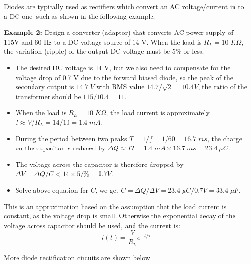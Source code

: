 Diodes are typically used as rectifiers which convert an AC voltage/current
in to a DC one, such as shown in the following example.

{\bf Example 2: } Design a converter (adaptor) that converts AC power 
supply of 115V and 60 Hz to a DC voltage source of 14 V. When the load is
$R_L=10\;K\Omega$, the variation (ripple) of the output DC voltage must 
be 5\% or less.



\begin{itemize}
\item The desired DC voltage is 14 V, but we also need to compensate for the
  voltage drop of 0.7 V due to the forward biased diode, so the  peak of the
  secondary output is $14.7\;V$ with RMS value $14.7/\sqrt{2}=10.4V$, the ratio
  of the transformer should be $115/10.4=11$. 
\item When the load is $R_L=10\;K\Omega$, the load current is approximately
  $I\approx V/R_L=14/10=1.4\;mA$.
\item During the period between two peaks $T=1/f=1/60=16.7\;ms$, the charge 
	on the capacitor is reduced by $\Delta Q\approx IT=1.4\;mA\times 
        16.7\;ms=23.4\;\mu C$. 	
\item The voltage across the capacitor is therefore dropped by
	$\Delta V=\Delta Q/C < 14\times 5/\%=0.7V $. 
\item Solve above equation for $C$, we get $C=\Delta Q/\Delta V
  =23.4\;\mu C/0.7V=33.4\;\mu F$.
\end{itemize}
This is an approximation based on the assumption that the load current is
constant, as the voltage drop is small. Otherwise the exponential decay of
the voltage across capacitor should be used, and the current is:
\[	i(t)=\frac{V}{R_L} e^{-t/\tau}	\]

More diode rectification circuits are shown below:



\begin{comment}
In the circuit on the left, voltages on $C_1$ and $C_2$ are both the 
same as the peak votage on the secondary side of the transformer, and
the voltage across $R_L$ is twice the voltage.

In the circuit on the right, voltage on $C_1$ is the peak voltage on 
the 2nd side of the transformer, voltegaes on both $C_2$ and $C_3$ 
are twice the voltage,  and the voltage across $R_L$ is three times
of that voltage.
\end{comment}

